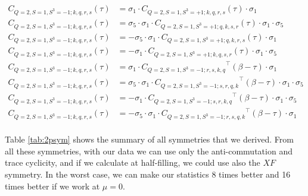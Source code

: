 \begin{equation}
  \begin{aligned}
    C_{Q=2,S=1,S^3=-1;k,q,r,s} (\tau) &= \sigma_1\cdot{C_{Q=2,S=1,S^3=+1;k,q,r,s}} (\tau) \cdot\sigma_1
    \\
    C_{Q=2,S=1,S^3=-1;k,q,r,s} (\tau) &= \sigma_5\cdot \sigma_1\cdot{C_{Q=2,S=1,S^3=+1;q,k,s,r}} (\tau) \cdot\sigma_1\cdot\sigma_5
    \\
    C_{Q=2,S=1,S^3=-1;k,q,r,s} (\tau) &= - \sigma_5\cdot \sigma_1\cdot{C_{Q=2,S=1,S^3=+1;q,k,r,s}} (\tau) \cdot\sigma_1
    \\
    C_{Q=2,S=1,S^3=-1;k,q,r,s} (\tau) &= - \sigma_1\cdot{C_{Q=2,S=1,S^3=+1;k,q,s,r}} (\tau) \cdot\sigma_1\cdot\sigma_5
    \\
    C_{Q=2,S=1,S^3=-1;k,q,r,s} (\tau) &= \sigma_1\cdot{C_{Q=2,S=1,S^3=-1;r,s,k,q}}^\top (\beta-\tau) \cdot\sigma_1 
    \\
    C_{Q=2,S=1,S^3=-1;k,q,r,s} (\tau) &= \sigma_5\cdot \sigma_1\cdot{C_{Q=2,S=1,S^3=-1;s,r,q,k}}^\top (\beta-\tau) \cdot\sigma_1\cdot\sigma_5
    \\
    C_{Q=2,S=1,S^3=-1;k,q,r,s} (\tau) &= - \sigma_1\cdot{C_{Q=2,S=1,S^3=-1;s,r,k,q}}^\top (\beta-\tau) \cdot\sigma_1\cdot\sigma_5 
    \\
    C_{Q=2,S=1,S^3=-1;k,q,r,s} (\tau) &= - \sigma_5\cdot \sigma_1\cdot{C_{Q=2,S=1,S^3=-1;r,s,q,k}}^\top (\beta-\tau) \cdot\sigma_1
    \\
  \end{aligned}
\end{equation}

Table \ref{tab:2psym} shows the summary of all symmetries that we derived. From all these symmetries, with our data we can use only the anti-commutation and trace cyclicity, and if we calculate at half-filling, we could use also the $XF$ symmetry. In the worst case, we can make our statistics 8 times better and 16 times better if we work at $\mu = 0$.

